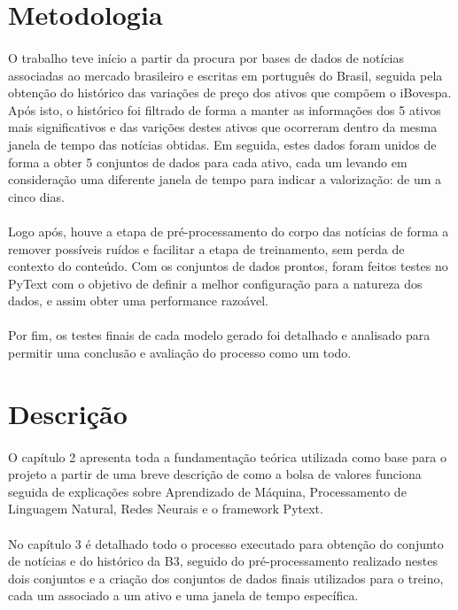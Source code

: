 \documentclass[grad,numbers]{coppe}
\begin{document}
		\section{Metodologia}
			\paragraph{}O trabalho teve início a partir da procura por bases de dados de notícias associadas ao mercado brasileiro e escritas em português do Brasil, seguida pela obtenção do histórico das variações de preço dos ativos que compõem o iBovespa. Após isto, o histórico foi filtrado de forma a manter as informações dos 5 ativos mais significativos e das varições destes ativos que ocorreram dentro da mesma janela de tempo das notícias obtidas. Em seguida, estes dados foram unidos de forma a obter 5 conjuntos de dados para cada ativo, cada um levando em consideração uma diferente janela de tempo para indicar a valorização: de um a cinco dias.
			\paragraph{}Logo após, houve a etapa de pré-processamento do corpo das notícias de forma a remover possíveis ruídos e facilitar a etapa de treinamento, sem perda de contexto do conteúdo. Com os conjuntos de dados prontos, foram feitos testes no PyText com o objetivo de definir a melhor configuração para a natureza dos dados, e assim obter uma performance razoável.
			\paragraph{}Por fim, os testes finais de cada modelo gerado foi detalhado e analisado para permitir uma conclusão e avaliação do processo como um todo.

		\section{Descrição}
			\paragraph{}O capítulo 2 apresenta toda a fundamentação teórica utilizada como base para o projeto a partir de uma breve descrição de como a bolsa de valores funciona seguida de explicações sobre Aprendizado de Máquina, Processamento de Linguagem Natural, Redes Neurais e o framework Pytext.
			\paragraph{}No capítulo 3 é detalhado todo o processo executado para obtenção do conjunto de notícias e do histórico da B3, seguido do pré-processamento realizado nestes dois conjuntos e a criação dos conjuntos de dados finais utilizados para o treino, cada um associado a um ativo e uma janela de tempo específica.
\end{document}
